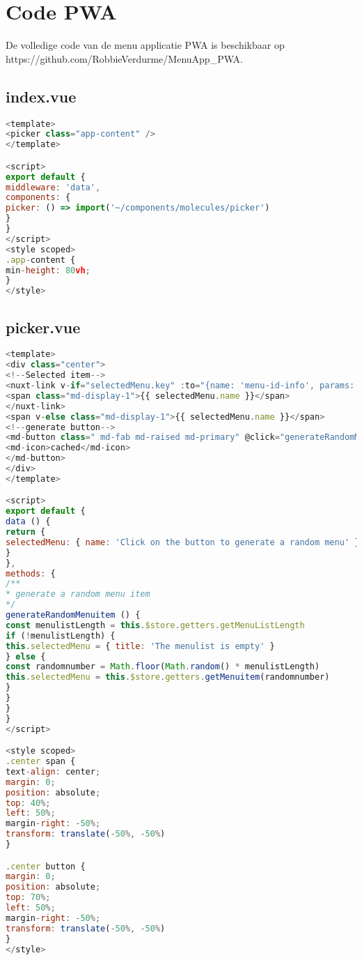\appendix 
\chapter{Code PWA}
De volledige code van de menu applicatie PWA is beschikbaar op https://github.com/RobbieVerdurme/MenuApp\_PWA.

\section{index.vue}
\begin{lstlisting}[caption=index.vue, language=Javascript]
<template>
<picker class="app-content" />
</template>

<script>
export default {
middleware: 'data',
components: {
picker: () => import('~/components/molecules/picker')
}
}
</script>
<style scoped>
.app-content {
min-height: 80vh;
}
</style>
\end{lstlisting}


\section{picker.vue}
\begin{lstlisting}[caption=picker.vue, language=Javascript]
<template>
<div class="center">
<!--Selected item-->
<nuxt-link v-if="selectedMenu.key" :to="{name: 'menu-id-info', params: {id: selectedMenu.key}}">
<span class="md-display-1">{{ selectedMenu.name }}</span>
</nuxt-link>
<span v-else class="md-display-1">{{ selectedMenu.name }}</span>
<!--generate button-->
<md-button class=" md-fab md-raised md-primary" @click="generateRandomMenuitem">
<md-icon>cached</md-icon>
</md-button>
</div>
</template>

<script>
export default {
data () {
return {
selectedMenu: { name: 'Click on the button to generate a random menu' }
}
},
methods: {
/**
* generate a random menu item
*/
generateRandomMenuitem () {
const menulistLength = this.$store.getters.getMenuListLength
if (!menulistLength) {
this.selectedMenu = { title: 'The menulist is empty' }
} else {
const randomnumber = Math.floor(Math.random() * menulistLength)
this.selectedMenu = this.$store.getters.getMenuitem(randomnumber)
}
}
}
}
</script>

<style scoped>
.center span {
text-align: center;
margin: 0;
position: absolute;
top: 40%;
left: 50%;
margin-right: -50%;
transform: translate(-50%, -50%)
}

.center button {
margin: 0;
position: absolute;
top: 70%;
left: 50%;
margin-right: -50%;
transform: translate(-50%, -50%)
}
</style>

\end{lstlisting}



